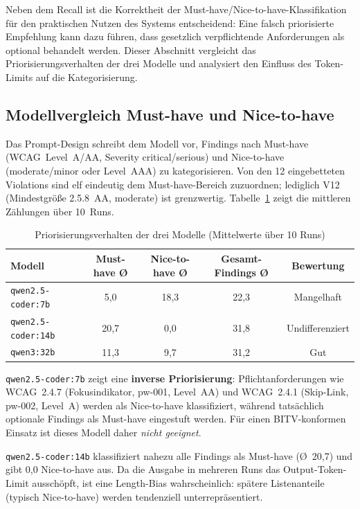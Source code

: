 Neben dem Recall ist die Korrektheit der Must-have/Nice-to-have-Klassifikation für den praktischen Nutzen des Systems entscheidend: Eine falsch priorisierte Empfehlung kann dazu führen, dass gesetzlich verpflichtende Anforderungen als optional behandelt werden. Dieser Abschnitt vergleicht das Priorisierungsverhalten der drei Modelle und analysiert den Einfluss des Token-Limits auf die Kategorisierung.

\subsection{Modellvergleich Must-have und Nice-to-have}
\label{sec:prio_modellvergleich}

Das Prompt-Design schreibt dem Modell vor, Findings nach Must-have (\ac{WCAG}~Level~A/AA, Severity critical/serious) und Nice-to-have (moderate/minor oder Level~AAA) zu kategorisieren. Von den 12 eingebetteten Violations sind elf eindeutig dem Must-have-Bereich zuzuordnen; lediglich V12 (Mindestgröße 2.5.8~AA, moderate) ist grenzwertig. Tabelle~\ref{tab:priorisierungsqualitaet} zeigt die mittleren Zählungen über 10~Runs.

\begin{table}[htbp]
\centering
\small
\renewcommand{\arraystretch}{1.15}
\begin{tabular}{@{}lcccc@{}}
\toprule
\textbf{Modell} & \textbf{Must-have Ø} & \textbf{Nice-to-have Ø} & \textbf{Gesamt-Findings Ø} & \textbf{Bewertung} \\
\midrule
\texttt{qwen2.5-coder:7b}  & 5,0  & 18,3 & 22,3 & Mangelhaft \\
\texttt{qwen2.5-coder:14b} & 20,7 & 0,0  & 31,8 & Undifferenziert \\
\texttt{qwen3:32b}         & 11,3 & 9,7  & 31,2 & Gut \\
\bottomrule
\end{tabular}
\caption{Priorisierungsverhalten der drei Modelle (Mittelwerte über 10 Runs)}
\label{tab:priorisierungsqualitaet}
\end{table}

\texttt{qwen2.5-coder:7b} zeigt eine \textbf{inverse Priorisierung}: Pflichtanforderungen wie \ac{WCAG}~2.4.7 (Fokusindikator, pw-001, Level~AA) und \ac{WCAG}~2.4.1 (Skip-Link, pw-002, Level~A) werden als Nice-to-have klassifiziert, während tatsächlich optionale Findings als Must-have eingestuft werden. Für einen \ac{BITV}-konformen Einsatz ist dieses Modell daher \textit{nicht geeignet}.

\texttt{qwen2.5-coder:14b} klassifiziert nahezu alle Findings als Must-have (\O{}~20,7) und gibt 0,0 Nice-to-have aus. Da die Ausgabe in mehreren Runs das Output-Token-Limit ausschöpft, ist eine Length-Bias wahrscheinlich: spätere Listenanteile (typisch Nice-to-have) werden tendenziell unterrepräsentiert.

